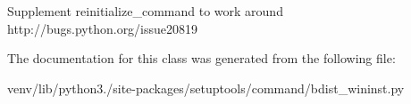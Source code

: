 \begin{DoxyVerb}Supplement reinitialize_command to work around
http://bugs.python.org/issue20819
\end{DoxyVerb}
 

The documentation for this class was generated from the following file\+:\begin{DoxyCompactItemize}
\item 
venv/lib/python3./site-\/packages/setuptools/command/bdist\+\_\+wininst.\+py\end{DoxyCompactItemize}
